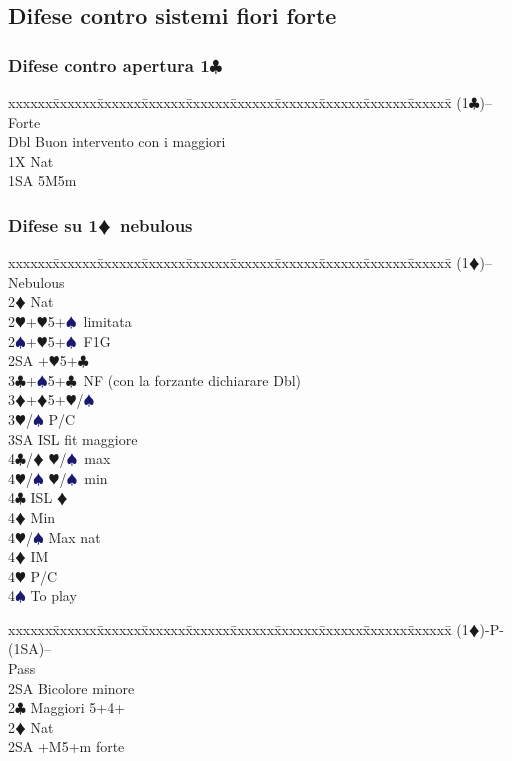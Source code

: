 \documentclass[a4paper,italian]{article}
\newcommand{\BC}{\textcolor{OliveGreen}{$\clubsuit$}}
\newcommand{\BD}{\textcolor{RedOrange}{$\vardiamondsuit$}}
\newcommand{\BH}{\textcolor{Red2}{$\varheartsuit${}}}
\newcommand{\BS}{\textcolor{MidnightBlue}{$\spadesuit${}}}
\newcommand{\pdfc}{\texorpdfstring{\BC{}}{C}}
\newcommand{\pdfd}{\texorpdfstring{\BD{}}{D}}
\newenvironment{bidtable}
{\begin{tabbing}

    xxxxxx\=xxxxxx\=xxxxxx\=xxxxxx\=xxxxxx\=xxxxxx\=xxxxxx\=xxxxxx\=xxxxxx\=xxxxxx\=\kill}
{\end{tabbing} }%
\begin{document}
\begin{multicols}{2}
    \subsection{Difese contro sistemi fiori forte}

    \subsubsection{Difese contro apertura 1\pdfc}

    \begin{bidtable}
        (1\BC)--\> Forte\+\\
        Dbl \> Buon intervento con i maggiori\\
        1X\> Nat\\
        1SA\> 5M5m
    \end{bidtable}

    \subsubsection{Difese su 1\pdfd\ nebulous}

    \begin{bidtable}
        (1\BD)-- \> Nebulous\+\\
        2\BD \> Nat\\
        2\BH {}+\BH 5+\BS\ limitata\\
        2\BS {}+\BH 5+\BS\ F1G\\
        2SA +\BH 5+\BC \\
        3\BC {}+\BS 5+\BC\ NF (con la forzante dichiarare Dbl)\\
        3\BD {}+\BD 5+\BH /\BS \+\\
        3\BH/\BS \> P/C\\
        3SA \> ISL fit maggiore\+\\
        4\BC/\BD \> \BH /\BS\ max\\
        4\BH/\BS \> \BH /\BS\ min\-\\
        4\BC \> ISL \BD \+\\
        4\BD \> Min\\
        4\BH/\BS \> Max nat\-\\
        4\BD \> IM\\
        4\BH \> P/C\\
        4\BS \> To play\-\-
    \end{bidtable}
    \begin{bidtable}
        (1\BD)-P-(1SA)--\+\\
        Pass\+\\
        2SA \> Bicolore minore\-\\
        2\BC \> Maggiori 5+4+\\
        2\BD \> Nat\\
        2SA +M5+m forte\-
    \end{bidtable}
\vfill\null
    \columnbreak


\end{multicols}
\end{document}
